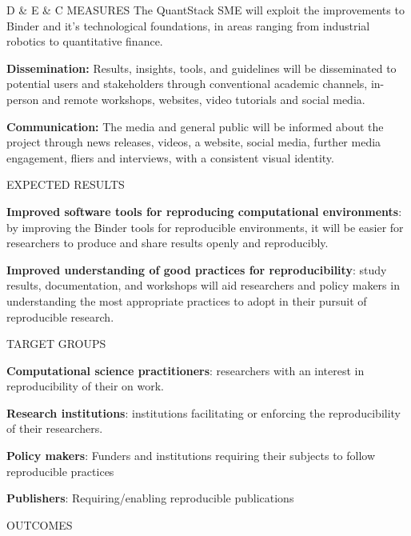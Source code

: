 \begin{multicols}{2}
\begin{summarybox}{D \& E \& C MEASURES}
The QuantStack SME will exploit the improvements to Binder and it's technological foundations, in areas ranging from
industrial robotics to quantitative finance.

\textbf{Dissemination:} Results, insights, tools, and guidelines will
  be disseminated to potential users and stakeholders through conventional
  academic channels, in-person and remote workshops, websites, video tutorials
  and social media.

\textbf{Communication:} The media and general public will be informed
  about the project through news releases, videos, a website, social media,
  further media engagement, fliers and interviews, with a consistent visual
  identity.
\end{summarybox}

\begin{summarybox}{EXPECTED RESULTS}

\textbf{Improved software tools for reproducing computational environments}:
by improving the Binder tools for reproducible environments,
it will be easier for researchers to produce and share results openly and reproducibly.

\textbf{Improved understanding of good practices for reproducibility}: study results, documentation, and workshops will aid researchers and policy makers in understanding the most appropriate practices to adopt in their pursuit of reproducible research.

\end{summarybox}

\begin{summarybox}{TARGET GROUPS}

\textbf{Computational science practitioners}: researchers with an interest in reproducibility of their on work.

\textbf{Research institutions}: institutions facilitating or enforcing the reproducibility of their researchers.

\textbf{Policy makers}: Funders and institutions requiring their subjects to follow reproducible practices

\textbf{Publishers}: Requiring/enabling reproducible publications
\end{summarybox}

\begin{summarybox}{OUTCOMES}


\end{summarybox}
\end{multicols}
